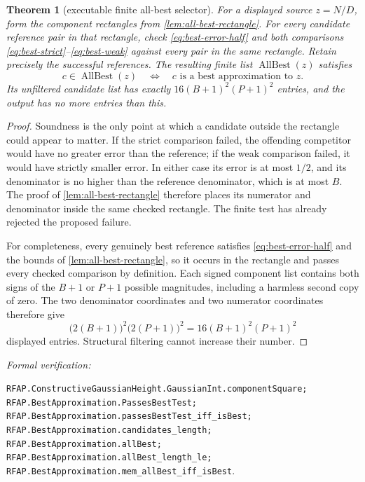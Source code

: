 \documentclass[11pt]{article}
\newtheorem{theorem}{Theorem}[section]
\newcommand{\leanref}[1]{\par\smallskip\noindent
  \emph{Formal verification:}\par\nobreak
  {\raggedright\nolinkurl{#1}.\par}}
\begin{document}
\begin{theorem}[executable finite all-best selector]
\label{thm:all-best-selector}
For a displayed source $z=N/D$, form the component rectangles from
\cref{lem:all-best-rectangle}.  For every candidate reference pair in that
rectangle, check \eqref{eq:best-error-half} and both comparisons
\eqref{eq:best-strict}--\eqref{eq:best-weak} against every pair in the same
rectangle.  Retain precisely the successful references.  The resulting
finite list $\operatorname{AllBest}(z)$ satisfies
\begin{equation}
\label{eq:all-best-membership}
 c\in\operatorname{AllBest}(z)
       \quad\Longleftrightarrow\quad
 c\text{ is a best approximation to }z.
\end{equation}
Its unfiltered candidate list has exactly
$16(B+1)^2(P+1)^2$ entries, and the output has no more entries than this.
\end{theorem}

\begin{proof}
Soundness is the only point at which a candidate outside the rectangle could
appear to matter.  If the strict comparison failed, the offending competitor
would have no greater error than the reference; if the weak comparison
failed, it would have strictly smaller error.  In either case its error is at
most $1/2$, and its denominator is no higher than the reference denominator,
which is at most $B$.  The proof of
\cref{lem:all-best-rectangle} therefore places its numerator and denominator
inside the same checked rectangle.  The finite test has already rejected the
proposed failure.

For completeness, every genuinely best reference satisfies
\eqref{eq:best-error-half} and the bounds of
\cref{lem:all-best-rectangle}, so it occurs in the rectangle and passes every
checked comparison by definition.  Each signed component list contains both
signs of the $B+1$ or $P+1$ possible magnitudes, including a harmless second
copy of zero.  The two denominator coordinates and two numerator coordinates
therefore give
\[
       \bigl(2(B+1)\bigr)^2\bigl(2(P+1)\bigr)^2
        =16(B+1)^2(P+1)^2
\]
displayed entries.  Structural filtering cannot increase their number.
\end{proof}

\leanref{RFAP.ConstructiveGaussianHeight.GaussianInt.componentSquare;
RFAP.BestApproximation.PassesBestTest;
RFAP.BestApproximation.passesBestTest_iff_isBest;
RFAP.BestApproximation.candidates_length;
RFAP.BestApproximation.allBest;
RFAP.BestApproximation.allBest_length_le;
RFAP.BestApproximation.mem_allBest_iff_isBest}
\end{document}
